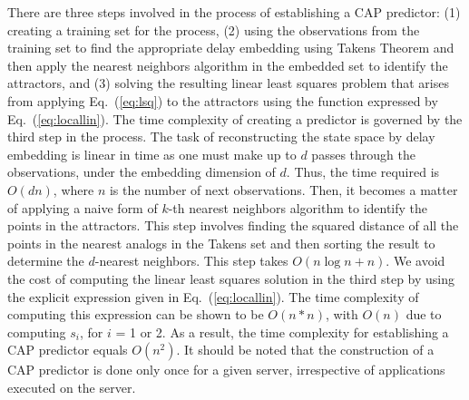 \documentclass[times,10pt,finalversion]{usetex-v1}
\begin{document}
There are three steps involved in the process of establishing a CAP
predictor: (1) creating a training set for the process, (2) using the
observations from the training set to find the appropriate delay
embedding using Takens Theorem and then apply the nearest neighbors
algorithm in the embedded set to identify the attractors, and (3)
solving the resulting linear least squares problem that arises from
applying Eq.~(\ref{eq:lsq}) to the attractors using the function
expressed by Eq.~(\ref{eq:locallin}). The time complexity of creating a
predictor is governed by the third step in the process.  The task of
reconstructing the state space by delay embedding is linear in time as
one must make up to $d$ passes through the observations, under the
embedding dimension of $d$.  Thus, the time required is $O(dn)$, where
$n$ is the number of next observations.  Then, it becomes a matter of
applying a naive form of $k$-th nearest neighbors algorithm to identify
the points in the attractors.  This step involves finding the squared
distance of all the points in the nearest analogs in the Takens set and
then sorting the result to determine the $d$-nearest neighbors.  This
step takes $O(n\log{n}+n)$.  We avoid the cost of computing the
linear least squares solution in the third step by using the explicit
expression given in Eq.~(\ref{eq:locallin}).
The time complexity of computing this expression can be shown to be $O(n*n)$,
with $O(n)$ due to computing $s_{i}$, for $i$ = 1 or 2.
As a result, the time complexity for establishing a CAP predictor
equals $O(n^{2})$.  It should be noted that
the construction of a CAP predictor is done only once for a given server,
irrespective of applications executed on the server.
\end{document}
